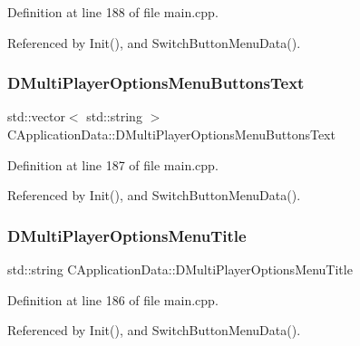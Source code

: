Definition at line 188 of file main.\+cpp.



Referenced by Init(), and Switch\+Button\+Menu\+Data().

\hypertarget{classCApplicationData_a400aa1df18482fe5d9f34e861a0dc257}{}\label{classCApplicationData_a400aa1df18482fe5d9f34e861a0dc257} 
\subsubsection{\texorpdfstring{D\+Multi\+Player\+Options\+Menu\+Buttons\+Text}{DMultiPlayerOptionsMenuButtonsText}}
{\footnotesize\ttfamily std\+::vector$<$ std\+::string $>$ C\+Application\+Data\+::\+D\+Multi\+Player\+Options\+Menu\+Buttons\+Text\hspace{0.3cm}{\ttfamily [protected]}}



Definition at line 187 of file main.\+cpp.



Referenced by Init(), and Switch\+Button\+Menu\+Data().

\hypertarget{classCApplicationData_aa9c4883274c2313743a42b68c7fc427f}{}\label{classCApplicationData_aa9c4883274c2313743a42b68c7fc427f} 
\subsubsection{\texorpdfstring{D\+Multi\+Player\+Options\+Menu\+Title}{DMultiPlayerOptionsMenuTitle}}
{\footnotesize\ttfamily std\+::string C\+Application\+Data\+::\+D\+Multi\+Player\+Options\+Menu\+Title\hspace{0.3cm}{\ttfamily [protected]}}



Definition at line 186 of file main.\+cpp.



Referenced by Init(), and Switch\+Button\+Menu\+Data().

\hypertarget{classCApplicationData_a99bed2c18513304de1cf2a2344bf091f}{}\label{classCApplicationData_a99bed2c18513304de1cf2a2344bf091f} 

